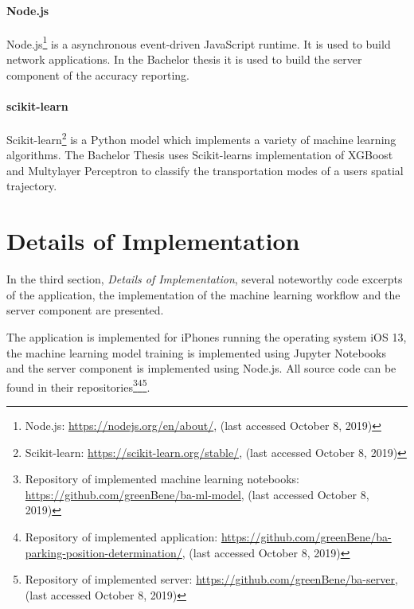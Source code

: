 \paragraph{Node.js} Node.js\footnote{Node.js: \url{https://nodejs.org/en/about/}, (last accessed October 8, 2019)} is a asynchronous event-driven JavaScript runtime. It is used to build network applications. In the Bachelor thesis it is used to build the server component of the accuracy reporting. \cite{node}

\paragraph{scikit-learn} Scikit-learn\footnote{Scikit-learn: \url{https://scikit-learn.org/stable/}, (last accessed October 8, 2019)} is a Python model which implements a variety of machine learning algorithms. The Bachelor Thesis uses Scikit-learns implementation of XGBoost and Multylayer Perceptron to classify the transportation modes of a users spatial trajectory. \cite{scikit-learn}

\section{Details of Implementation}
In the third section, \textit{Details of Implementation}, several noteworthy code excerpts of the application, the implementation of the machine learning workflow and the server component are presented.

The application is implemented for iPhones running the operating system iOS 13, the machine learning model training is implemented using Jupyter Notebooks and the server component is implemented using Node.js. All source code can be found in their repositories\footnote{Repository of implemented machine learning notebooks: \url{https://github.com/greenBene/ba-ml-model}, (last accessed October 8, 2019)}\footnote{Repository of implemented application: \url{https://github.com/greenBene/ba-parking-position-determination/}, (last accessed October 8, 2019)}\footnote{Repository of implemented server: \url{https://github.com/greenBene/ba-server}, (last accessed October 8, 2019)}.

